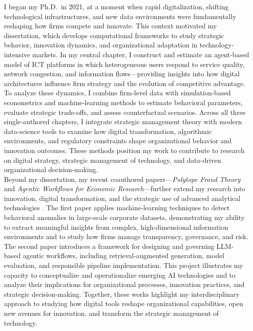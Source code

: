 \documentclass{nfr}
\begin{document}
I began my Ph.D.\ in 2021, at a moment when rapid digitalization, shifting technological infrastructures, and new data environments were fundamentally reshaping how firms compete and innovate. 
This context motivated my dissertation, which develops computational frameworks to study strategic behavior, innovation dynamics, and organizational adaptation in technology‐intensive markets. 
In my central chapter, I construct and estimate an agent‐based model of ICT platforms in which heterogeneous users respond to service quality, network congestion, and information flows—providing insights into how digital architectures influence firm strategy and the evolution of competitive advantage. 
To analyze these dynamics, I combine firm‐level data with simulation‐based econometrics and machine‐learning methods to estimate behavioral parameters, evaluate strategic trade-offs, and assess counterfactual scenarios. 
Across all three single-authored chapters, I integrate strategic management theory with modern data-science tools to examine how digital transformation, algorithmic environments, and regulatory constraints shape organizational behavior and innovation outcomes. 
These methods position my work to contribute to research on digital strategy, strategic management of technology, and data-driven organizational decision-making.\\

Beyond my dissertation, my recent coauthored papers—\textit{Polytope Fraud Theory} and \textit{Agentic Workflows for Economic Research}—further extend my research into innovation, digital transformation, and the strategic use of advanced analytical technologies \citep{Zhao2025, Dawid2025}. 
The first paper applies machine-learning techniques to detect behavioral anomalies in large-scale corporate datasets, demonstrating my ability to extract meaningful insights from complex, high-dimensional information environments and to study how firms manage transparency, governance, and risk. 
The second paper introduces a framework for designing and governing LLM-based agentic workflows, including retrieval-augmented generation, model evaluation, and responsible pipeline implementation. 
This project illustrates my capacity to conceptualize and operationalize emerging AI technologies and to analyze their implications for organizational processes, innovation practices, and strategic decision-making. 
Together, these works highlight my interdisciplinary approach to studying how digital tools reshape organizational capabilities, open new avenues for innovation, and transform the strategic management of technology.\\
\end{document}
